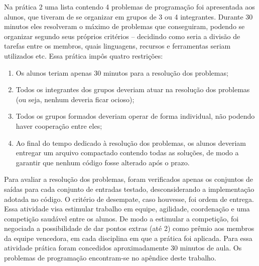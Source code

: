 Na prática 2 uma lista contendo 4 problemas de programação foi apresentada aos alunos, que tiveram de se organizar em grupos de 3 ou 4 integrantes. Durante 30 minutos eles resolveram o máximo de problemas que conseguiram, podendo se organizar segundo seus próprios critérios -- decidindo como seria a divisão de tarefas entre os membros, quais linguagens, recursos e ferramentas seriam utilizados etc. Essa prática impôs quatro restrições: 
    \begin{enumerate}\setlength\itemsep{0.5em}
        \item Os alunos teriam apenas 30 minutos para a resolução dos problemas;
        \item Todos os integrantes dos grupos deveriam atuar na resolução dos problemas (ou seja, nenhum deveria ficar ocioso);
        \item Todos os grupos formados deveriam operar de forma individual, não podendo haver cooperação entre eles;
        \item Ao final do tempo dedicado à resolução dos problemas, os alunos deveriam entregar um arquivo compactado contendo todas as soluções, de modo a garantir que nenhum código fosse alterado após o prazo.
    \end{enumerate}
Para avaliar a resolução dos problemas, foram verificados apenas os conjuntos de saídas para cada conjunto de entradas testado, desconsiderando a implementação adotada no código. O critério de desempate, caso houvesse, foi ordem de entrega. Essa atividade visa estimular trabalho em equipe, agilidade, coordenação e uma competição saudável entre os alunos. De modo a estimular a competição, foi negociada a possibilidade de dar pontos extras (até 2) como prêmio aos membros da equipe vencedora, em cada disciplina em que a prática foi aplicada. Para essa atividade prática foram concedidos aproximadamente 30 minutos de aula. Os problemas de programação encontram-se no apêndice deste trabalho. 

